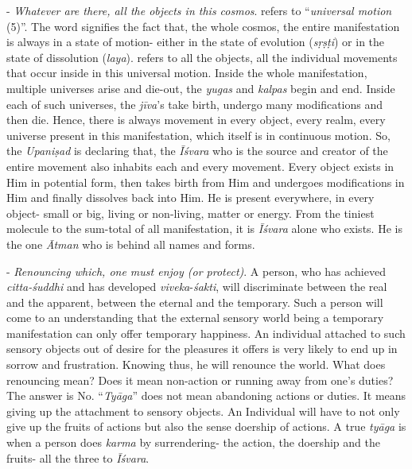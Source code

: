 - \emph{Whatever are there, all the objects in this cosmos}.  refers to ``\emph{universal motion} (5)''. The word signifies the fact that, the whole cosmos, the entire manifestation is always in a state of motion- either in the state of evolution (\emph{sṛṣṭi}) or in the state of dissolution (\emph{laya}).  refers to all the objects, all the individual movements that occur inside in this universal motion. Inside the whole manifestation, multiple universes arise and die-out, the \emph{yugas} and \emph{kalpas} begin and end. Inside each of such universes, the \emph{jīva}'s take birth, undergo many modifications and then die. Hence, there is always movement in every object, every realm, every universe present in this manifestation, which itself is in continuous motion. So, the \emph{Upaniṣad} is declaring that, the \emph{Īśvara} who is the source and creator of the entire movement also inhabits each and every movement. Every object exists in Him in potential form, then takes birth from Him and undergoes modifications in Him and finally dissolves back into Him. He is present everywhere, in every object- small or big, living or non-living, matter or energy. From the tiniest molecule to the sum-total of all manifestation, it is \emph{Īśvara} alone who exists. He is the one \emph{Ātman} who is behind all names and forms.
\vskip 1.1pt

- \emph{Renouncing which, one must enjoy (or protect)}. A person, who has achieved \emph{citta-śuddhi} and has developed \emph{viveka}-\emph{śakti}, will discriminate between the real and the apparent, between the eternal and the temporary. Such a person will come to an understanding that the external sensory world being a temporary manifestation can only offer temporary happiness. An individual attached to such sensory objects out of desire for the pleasures it offers is very likely to end up in sorrow and frustration. Knowing thus, he will renounce the world. What does renouncing mean? Does it mean non-action or running away from one's duties? The answer is No. ``\emph{Tyāga}'' does not mean abandoning actions or duties. It means giving up the attachment to sensory objects. An Individual will have to not only give up the fruits of actions but also the sense doership of actions. A true \emph{tyāga} is when a person does \emph{karma} by surrendering- the action, the doership and the fruits- all the three to \emph{Īśvara}.
\vskip 1.1pt

